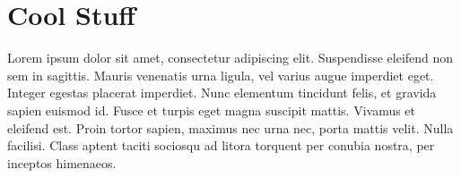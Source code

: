 \chapter{Cool Stuff}
Lorem ipsum dolor sit amet, consectetur adipiscing elit. Suspendisse eleifend non sem in sagittis. Mauris venenatis urna ligula, vel varius augue imperdiet eget. Integer egestas placerat imperdiet. Nunc elementum tincidunt felis, et gravida sapien euismod id. Fusce et turpis eget magna suscipit mattis. Vivamus et eleifend est. Proin tortor sapien, maximus nec urna nec, porta mattis velit. Nulla facilisi. Class aptent taciti sociosqu ad litora torquent per conubia nostra, per inceptos himenaeos.